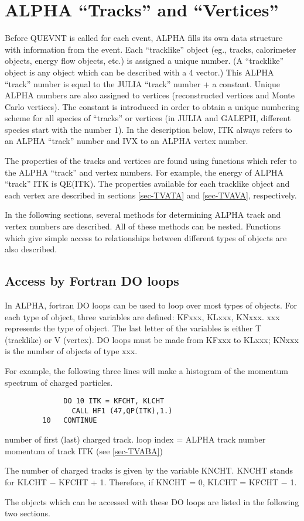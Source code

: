  \chapter{\label{sec-A}ALPHA ``Tracks'' and ``Vertices''}
\par
Before QUEVNT is called for each event, ALPHA fills its own data structure
with information from the event.  Each ``tracklike'' object (eg.,
tracks, calorimeter objects, energy flow objects, etc.) is
assigned a unique number. (A ``tracklike'' object is any object which
can be
described with a 4 vector.)
This ALPHA ``track'' number is equal to the JULIA
``track'' number + a constant. Unique ALPHA numbers are also assigned
to
vertices (reconstructed vertices and Monte Carlo vertices).
The constant is introduced in order to obtain a unique numbering scheme
for all
species of ``tracks'' or vertices (in JULIA and GALEPH,
different species start with
the number 1).  In the description below, ITK always refers to an
ALPHA ``track''
number and IVX to an ALPHA vertex number.
\par The properties of the tracks and vertices are found using functions
which
refer to the ALPHA ``track'' and vertex numbers. For example, the
energy of
ALPHA ``track'' ITK is QE(ITK). The properties available for each
tracklike
object and each vertex are described in sections \ref{sec-TVATA}
and \ref{sec-TVAVA}, respectively.
\par
In the following sections, several methods for determining ALPHA track
and vertex numbers are described. All of these methods can be nested.
Functions which give simple access to relationships between different
types of objects are also described.
 
\section{\label{sec-AL}Access by Fortran DO loops}
\par
In ALPHA, fortran DO loops can be used to loop over most types of
objects.
For each type of object, three variables are defined:
KFxxx, KLxxx, KNxxx. xxx represents the type of object. The last
letter of the variables is either T (tracklike) or V (vertex).
DO loops must be made from KFxxx to KLxxx; KNxxx is the number of
objects
of type xxx.
\par
For example, the following three lines will make a histogram of
the momentum spectrum of charged particles.
\begin{verbatim}
              DO 10 ITK = KFCHT, KLCHT
                CALL HF1 (47,QP(ITK),1.)
         10   CONTINUE
\end{verbatim}
\begin{indentlist}{ 3.25cm}{ 3.50cm}
number of first (last) charged track.
loop index = ALPHA track number
momentum of track ITK (see \ref{sec-TVABA})
\end{indentlist}
The number of charged tracks is given by the variable
KNCHT.
KNCHT stands for KLCHT $-$ KFCHT + 1.
Therefore, if KNCHT = 0, KLCHT = KFCHT $-$ 1.
\par The objects which can be accessed with these DO loops are
listed in the following two sections.
 
